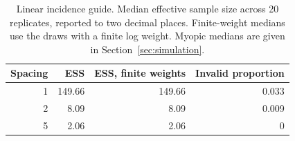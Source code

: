\begin{table}[t]
\centering
\caption{Linear incidence guide. Median effective sample size across 20 replicates, reported to two decimal places. Finite-weight medians use the draws with a finite log weight. Myopic medians are given in Section~\ref{sec:simulation}.}
\label{tab:s1}
{\small\setlength{\tabcolsep}{3pt}%
\begin{tabular}{rrrr}
\hline
Spacing & ESS & ESS, finite weights & Invalid proportion \\
\hline
1 & 149.66 & 149.66 & 0.033 \\
2 & 8.09 & 8.09 & 0.009 \\
5 & 2.06 & 2.06 & 0 \\
\hline
\end{tabular}}
\end{table}
